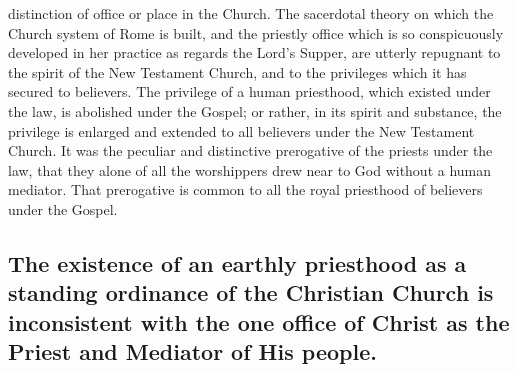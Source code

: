 \documentclass[english,]{book}
\begin{document}
distinction of office or place in the Church. The sacerdotal theory on which the Church system of Rome is built, and the priestly office which is so conspicuously developed in her practice as regards the Lord's Supper, are utterly repugnant to the spirit of the New Testament Church, and to the privileges which it has secured to believers. The privilege of a human priesthood, which existed under the law, is abolished under the Gospel; or rather, in its spirit and substance, the privilege is enlarged and extended to all believers under the New Testament Church. It was the peculiar and distinctive prerogative of the priests under the law, that they alone of all the worshippers drew near to God without a human mediator. That prerogative is common to all the royal priesthood of believers under the Gospel.

\hypertarget{the-existence-of-an-earthly-priesthood-as-a-standing-ordinance-of-the-christian-church-is-inconsistent-with-the-one-office-of-christ-as-the-priest-and-mediator-of-his-people.}{%
\subsection{The existence of an earthly priesthood as a standing ordinance of the Christian Church is inconsistent with the one office of Christ as the Priest and Mediator of His people.}\label{the-existence-of-an-earthly-priesthood-as-a-standing-ordinance-of-the-christian-church-is-inconsistent-with-the-one-office-of-christ-as-the-priest-and-mediator-of-his-people.}}
\end{document}
